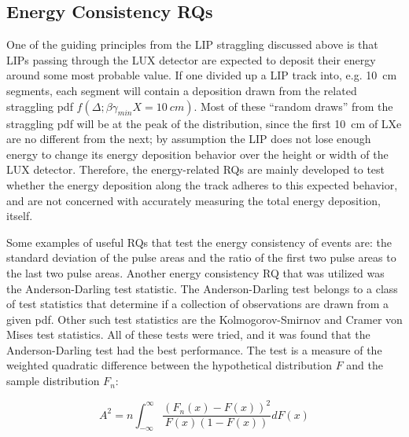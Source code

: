 \subsection{Energy Consistency RQs}
One of the guiding principles from the \ac{LIP} straggling discussed above is that \ac{LIP}s passing through the \ac{LUX} detector are expected to deposit their energy around some most probable value. If one divided up a \ac{LIP} track into, e.g. 10~cm segments, each segment will contain a deposition drawn from the related straggling \ac{pdf} $f(\Delta; \beta \gamma_{min} X=10~cm)$. Most of these ``random draws'' from the straggling \ac{pdf} will be at the peak of the distribution, since the first 10~cm of \ac{LXe} are no different from the next; by assumption the \ac{LIP} does not lose enough energy to change its energy deposition behavior over the height or width of the \ac{LUX} detector. Therefore, the energy-related \ac{RQ}s are mainly developed to test whether the energy deposition along the track adheres to this expected behavior, and are not concerned with accurately measuring the total energy deposition, itself. 

Some examples of useful \ac{RQ}s that test the energy consistency of events are: the standard deviation of the pulse areas and the ratio of the first two pulse areas to the last two pulse areas. Another energy consistency \ac{RQ} that was utilized was the Anderson-Darling test statistic. The Anderson-Darling test belongs to a class of test statistics that determine if a collection of observations are drawn from a given \ac{pdf}. Other such test statistics are the Kolmogorov-Smirnov and Cramer von Mises test statistics. All of these tests were tried, and it was found that the Anderson-Darling test had the best performance. The test is a measure of the weighted quadratic difference between the hypothetical distribution $F$ and the sample distribution $F_{n}$:

\begin{equation}
A^{2} = n \int_{-\infty}^{\infty} \frac{ (F_{n}(x) - F(x))^{2}}{F(x)(1-F(x))} dF(x)
\end{equation}

